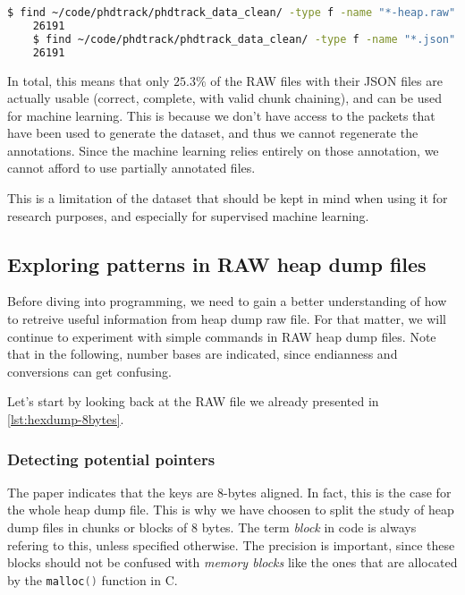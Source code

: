     \begin{lstlisting}[language=bash, caption={Command and logs of counting the number of RAW files in the cleaned dataset.}]
    $ find ~/code/phdtrack/phdtrack_data_clean/ -type f -name "*-heap.raw" | wc -l
    26191
    $ find ~/code/phdtrack/phdtrack_data_clean/ -type f -name "*.json" | wc -l
    26191
    \end{lstlisting}

    In total, this means that only $25.3\% $ of the RAW files with their JSON files are actually usable (correct, complete, with valid chunk chaining), and can be used for machine learning. This is because we don't have access to the packets that have been used to generate the dataset, and thus we cannot regenerate the annotations. Since the machine learning relies entirely on those annotation, we cannot afford to use partially annotated files. 
    
    This is a limitation of the dataset that should be kept in mind when using it for research purposes, and especially for supervised machine learning.

    \subsection{Exploring patterns in RAW heap dump files}
    Before diving into programming, we need to gain a better understanding of how to retreive useful information from heap dump raw file. For that matter, we will continue to experiment with simple commands in RAW heap dump files. Note that in the following, number bases are indicated, since endianness and conversions can get confusing.

    Let's start by looking back at the RAW file we already presented in \ref{lst:hexdump-8bytes}.

    \subsubsection{Detecting potential pointers}
    The paper  indicates that the keys are 8-bytes aligned. In fact, this is the case for the whole heap dump file. This is why we have choosen to split the study of heap dump files in chunks or blocks of 8 bytes. The term \textit{block} in code is always refering to this, unless specified otherwise. The precision is important, since these blocks should not be confused with \textit{memory blocks} like the ones that are allocated by the \lstinline[language=c]|malloc()| function in C.

